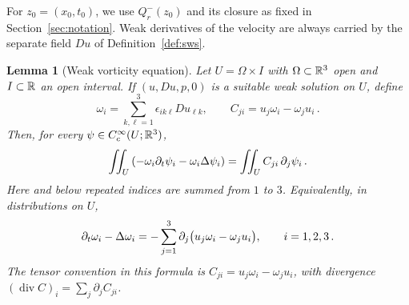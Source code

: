 \documentclass[11pt,letterpaper]{article}
\numberwithin{equation}{section}
\theoremstyle{plain}
\newtheorem{lemma}[theorem]{Lemma}
\theoremstyle{definition}
\theoremstyle{remark}
\begin{document}
For $z_0=(x_0,t_0)$, we use $Q_r^-(z_0)$ and its closure as fixed in
Section~\ref{sec:notation}. Weak derivatives of the velocity are
always carried by the separate field $Du$ of Definition~\ref{def:sws}.

\begin{lemma}[Weak vorticity equation]\label{lem:vorticity-weak-eq}
Let $U=\Omega\times I$ with $\Omega\subset\mathbb{R}^3$ open and $I\subset\mathbb{R}$ an open interval. If $(u,Du,p,0)$ is a suitable weak solution on $U$, define
\[
 \omega_i=\sum_{k,\ell=1}^3\epsilon_{ik\ell}Du_{\ell k},
 \qquad
 C_{ji}=u_j\omega_i-\omega_j u_i\,.
\]
Then, for every $\psi\in C_c^\infty(U;\mathbb{R}^3)$,
\begin{equation}\label{eq:vorticity-weak-eq}
 \iint_U\left(-\omega_i\partial_t\psi_i-\omega_i\Delta\psi_i\right)
 =\iint_U C_{ji}\,\partial_j\psi_i\,.
\end{equation}
Here and below repeated indices are summed from $1$ to $3$. Equivalently, in distributions on $U$,
\[
 \partial_t\omega_i-\Delta\omega_i
 =-\sum_{j=1}^3\partial_j\big(u_j\omega_i-\omega_j u_i\big),
 \qquad i=1,2,3\,.
\]
The tensor convention in this formula is $C_{ji}=u_j\omega_i-\omega_j u_i$, with divergence $(\operatorname{div}C)_i=\sum_j\partial_j C_{ji}$.
\end{lemma}
\end{document}
